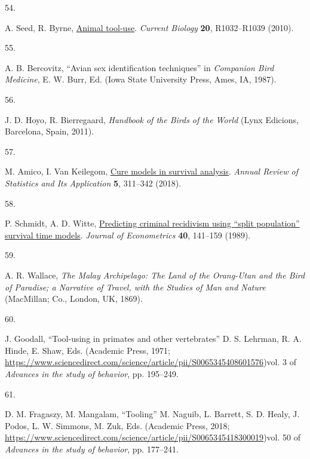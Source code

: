 \documentclass[
  man,floatsintext]{apa6}
\newlength{\cslhangindent}
\newlength{\csllabelwidth}
\newlength{\cslentryspacingunit} %
\newenvironment{CSLReferences}[2] %
 {%
  \setlength{\parindent}{0pt}
  \ifodd #1
  \let\oldpar\par
  \def\par{\hangindent=\cslhangindent\oldpar}
  \fi
  \setlength{\parskip}{#2\cslentryspacingunit}
 }%
 {}
\newcommand{\CSLLeftMargin}[1]{\parbox[t]{\csllabelwidth}{#1}}
\newcommand{\CSLRightInline}[1]{\parbox[t]{\linewidth - \csllabelwidth}{#1}\break}
\begin{document}
\begin{CSLReferences}{0}{0}
\leavevmode{}%
\CSLLeftMargin{54. }%
\CSLRightInline{A. Seed, R. Byrne, \href{https://doi.org/10.1016/j.cub.2010.09.042}{Animal tool-use}. \emph{Current Biology} \textbf{20}, R1032--R1039 (2010).}

\leavevmode{}%
\CSLLeftMargin{55. }%
\CSLRightInline{A. B. Bercovitz, {``Avian sex identification techniques''} in \emph{Companion Bird Medicine}, E. W. Burr, Ed. (Iowa State University Press, Ames, IA, 1987).}

\leavevmode{}%
\CSLLeftMargin{56. }%
\CSLRightInline{J. D. Hoyo, R. Bierregaard, \emph{Handbook of the Birds of the World} (Lynx Edicions, Barcelona, Spain, 2011).}

\leavevmode{}%
\CSLLeftMargin{57. }%
\CSLRightInline{M. Amico, I. Van Keilegom, \href{https://doi.org/10.1146/annurev-statistics-031017-100101}{Cure models in survival analysis}. \emph{Annual Review of Statistics and Its Application} \textbf{5}, 311--342 (2018).}

\leavevmode{}%
\CSLLeftMargin{58. }%
\CSLRightInline{P. Schmidt, A. D. Witte, \href{https://doi.org/10.1016/0304-4076(89)90034-1}{Predicting criminal recidivism using {``split population''} survival time models}. \emph{Journal of Econometrics} \textbf{40}, 141--159 (1989).}

\leavevmode{}%
\CSLLeftMargin{59. }%
\CSLRightInline{A. R. Wallace, \emph{The {M}alay {A}rchipelago: The Land of the Orang-Utan and the Bird of Paradise; a Narrative of Travel, with the Studies of Man and Nature} (MacMillan; Co., London, UK, 1869).}

\leavevmode{}%
\CSLLeftMargin{60. }%
\CSLRightInline{J. Goodall, {``Tool-using in primates and other vertebrates''} D. S. Lehrman, R. A. Hinde, E. Shaw, Eds. (Academic Press, 1971; \url{https://www.sciencedirect.com/science/article/pii/S0065345408601576})vol. 3 of \emph{Advances in the study of behavior}, pp. 195--249.}

\leavevmode{}%
\CSLLeftMargin{61. }%
\CSLRightInline{D. M. Fragaszy, M. Mangalam, {``Tooling''} M. Naguib, L. Barrett, S. D. Healy, J. Podos, L. W. Simmons, M. Zuk, Eds. (Academic Press, 2018; \url{https://www.sciencedirect.com/science/article/pii/S0065345418300019})vol. 50 of \emph{Advances in the study of behavior}, pp. 177--241.}


\end{CSLReferences}
\end{document}
